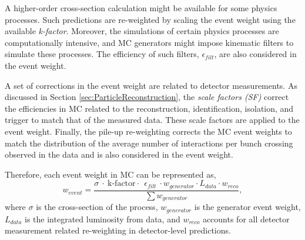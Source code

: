 A higher-order cross-section calculation might be available for some physics processes. Such predictions are re-weighted by scaling the event weight using the available \textit{k-factor}. Moreover, the simulations of certain physics processes are computationally intensive, and MC generators might impose kinematic filters to simulate these processes. The efficiency of such filters, $\epsilon_{filt}$, are also considered in the event weight. 

A set of corrections in the event weight are related to detector measurements. As discussed in Section \ref{sec:ParticleReconstruction}, the \textit{scale factors (SF)} correct the efficiencies in MC related to the reconstruction, identification, isolation, and trigger to match that of the measured data. These scale factors are applied to the event weight. Finally, the pile-up re-weighting corrects the MC event weights to match the distribution of the average number of interactions per bunch crossing observed in the data and is also considered in the event weight.

Therefore, each event weight in MC can be represented as, 
\begin{equation}
w_{event} = \frac{\sigma~\cdot~\text{k-factor}\cdot~~\epsilon_{filt}~\cdot w_{generator} \cdot {L_{data} \cdot w_{reco}}}{\sum{w_{generator}}},
\label{eqn:EventWeight}
\end{equation}
where $\sigma$ is the cross-section of the process, $w_{generator}$ is the generator event weight, $L_{data}$ is the integrated luminosity from data, and $w_{reco}$ accounts for all detector measurement related re-weighting in detector-level predictions.
